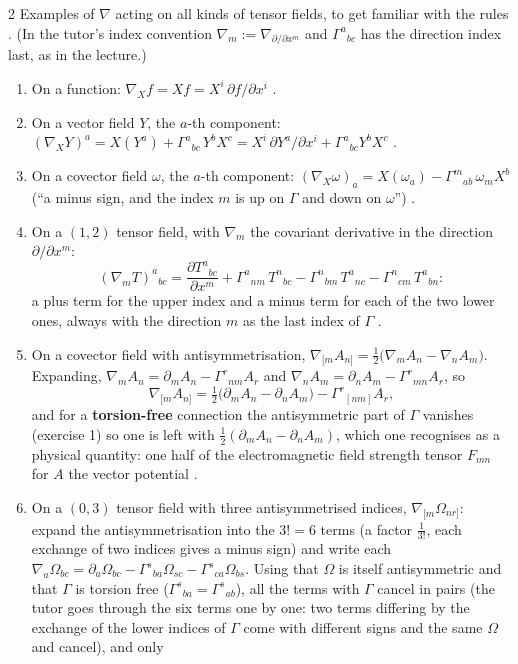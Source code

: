 \begin{paracol}{2}
Examples of $\nabla$ acting on all kinds of tensor fields, to get familiar with the rules . (In the tutor's index convention $\nabla_m:=\nabla_{\partial/\partial x^m}$ and $\Gamma^a{}_{bc}$ has the direction index last, as in the lecture.)
\begin{enumerate}
  \item On a function: $\nabla_Xf=Xf=X^i\,\partial f/\partial x^i$ .
  \item On a vector field $Y$, the $a$-th component: $(\nabla_XY)^a=X(Y^a)+\Gamma^a{}_{bc}\,Y^bX^c=X^i\,\partial Y^a/\partial x^i+\Gamma^a{}_{bc}Y^bX^c$ .
  \item On a covector field $\omega$, the $a$-th component: $(\nabla_X\omega)_a=X(\omega_a)-\Gamma^m{}_{ab}\,\omega_mX^b$ (``a minus sign, and the index $m$ is up on $\Gamma$ and down on $\omega$'') .
  \item On a $(1,2)$ tensor field, with $\nabla_m$ the covariant derivative in the direction $\partial/\partial x^m$:
        \[
          (\nabla_mT)^a{}_{bc}=\frac{\partial T^a{}_{bc}}{\partial x^m}+\Gamma^a{}_{nm}\,T^n{}_{bc}-\Gamma^n{}_{bm}\,T^a{}_{nc}-\Gamma^n{}_{cm}\,T^a{}_{bn}:
        \]
        a plus term for the upper index and a minus term for each of the two lower ones, always with the direction $m$ as the last index of $\Gamma$ .
  \item On a covector field with antisymmetrisation, $\nabla_{[m}A_{n]}=\tfrac12\bigl(\nabla_mA_n-\nabla_nA_m\bigr)$. Expanding, $\nabla_mA_n=\partial_mA_n-\Gamma^r{}_{nm}A_r$ and $\nabla_nA_m=\partial_nA_m-\Gamma^r{}_{mn}A_r$, so
        \[
          \nabla_{[m}A_{n]}=\tfrac12\bigl(\partial_mA_n-\partial_nA_m\bigr)-\Gamma^r{}_{[nm]}A_r,
        \]
        and for a \textbf{torsion-free} connection the antisymmetric part of $\Gamma$ vanishes (exercise 1) so one is left with $\tfrac12(\partial_mA_n-\partial_nA_m)$, which one recognises as a physical quantity: one half of the electromagnetic field strength tensor $F_{mn}$ for $A$ the vector potential .
  \item On a $(0,3)$ tensor field with three antisymmetrised indices, $\nabla_{[m}\Omega_{nr]}$: expand the antisymmetrisation into the $3!=6$ terms (a factor $\tfrac1{3!}$, each exchange of two indices gives a minus sign) and write each $\nabla_a\Omega_{bc}=\partial_a\Omega_{bc}-\Gamma^s{}_{ba}\Omega_{sc}-\Gamma^s{}_{ca}\Omega_{bs}$. Using that $\Omega$ is itself antisymmetric and that $\Gamma$ is torsion free ($\Gamma^s{}_{ba}=\Gamma^s{}_{ab}$), all the terms with $\Gamma$ cancel in pairs (the tutor goes through the six terms one by one: two terms differing by the exchange of the lower indices of $\Gamma$ come with different signs and the same $\Omega$ and cancel), and only

\end{enumerate}
\end{paracol}
